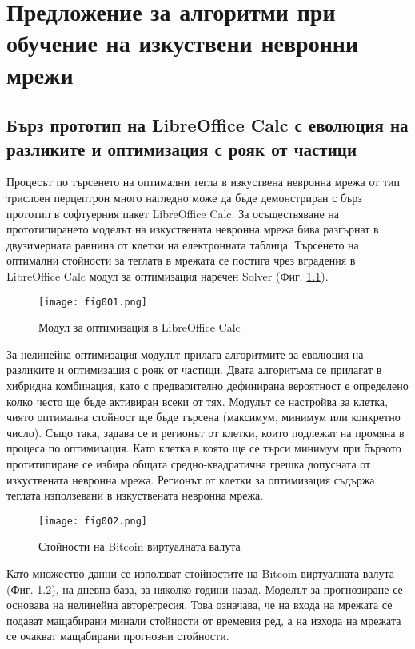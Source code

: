 ﻿\chapter{Предложение за алгоритми при обучение на изкуствени невронни мрежи}

\section{Бърз прототип на LibreOffice Calc с еволюция на разликите и оптимизация с рояк от частици}

Процесът по търсенето на оптимални тегла в изкуствена невронна мрежа от тип трислоен перцептрон много нагледно може да бъде демонстриран с бърз прототип в софтуерния пакет LibreOffice Calc. За осъществяване на прототипирането моделът на изкуствената невронна мрежа бива разгърнат в двузимерната равнина от клетки на електронната таблица. Търсенето на оптимални стойности за теглата в мрежата се постига чрез вградения в LibreOffice Calc модул за оптимизация наречен Solver (Фиг. \ref{fig001}).

\begin{figure}[h]
  \centering
  \texttt{[image: fig001.png]}
  \caption{Модул за оптимизация в LibreOffice Calc}
\label{fig001}
\end{figure}

За нелинейна оптимизация модулът прилага алгоритмите за еволюция на разликите и оптимизация с рояк от частици. Двата алгоритъма се прилагат в хибридна комбинация, като с предварително дефинирана вероятност е определено колко често ще бъде активиран всеки от тях. Модулът се настройва за клетка, чиято оптимална стойност ще бъде търсена (максимум, минимум или конкретно число). Също така, задава се и регионът от клетки, които подлежат на промяна в процеса по оптимизация. Като клетка в която ще се търси минимум при бързото протитипиране се избира общата средно-квадратична грешка допусната от изкуствената невронна мрежа. Регионът от клетки за оптимизация съдържа теглата използевани в изкуствената невронна мрежа. 

\begin{figure}[h]
  \centering
  \texttt{[image: fig002.png]}
  \caption{Стойности на Bitcoin виртуалната валута}
\label{fig002}
\end{figure}

Като множество данни се използват стойностите на Bitcoin виртуалната валута (Фиг. \ref{fig002}), на дневна база, за няколко години назад. Моделът за прогнозиране се основава на нелинейна авторегресия. Това означава, че на входа на мрежата се подават мащабирани минали стойности от времевия ред, а на изхода на мрежата се очакват мащабирани прогнозни стойности. 

